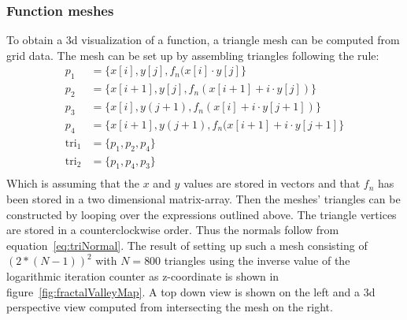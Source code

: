\subsubsection{Function meshes}
To obtain a 3d visualization of a function, a triangle mesh can be computed from grid data. The mesh can be set up by assembling triangles following the rule:
\begin{align}
p_1 &= \{x[i],y[j],f_n(x[i]\cdot y[j]\}			\\
p_2 &= \{x[i+1],y[j],f_n(x[i+1] + i\cdot y[j])\}		\\
p_3 &= \{x[i],y(j+1),f_n(x[i]+i\cdot y[j+1])\}		\\
p_4 &= \{x[i+1],y(j+1),f_n(x[i+1]+i\cdot y[j+1]\}	\\
\text{tri}_1 &= \{p_1,p_2,p_4\} \\
\text{tri}_2 &= \{p_1,p_4,p_3\} \\
\end{align}
Which is assuming that the $x$ and $y$ values are stored in vectors and that $f_n$ has been stored in a two dimensional matrix-array. Then the meshes' triangles
can be constructed by looping over the expressions outlined above. The triangle vertices are stored in a counterclockwise order. Thus the normals follow from equation~\ref{eq:triNormal}. The result of setting up such a mesh consisting of $(2*(N-1))^2$ with $N = 800$ triangles using the inverse value of the logarithmic iteration counter as z-coordinate is shown in figure~\ref{fig:fractalValleyMap}. A top down view is shown on the left and a 3d perspective view computed from intersecting the mesh on the right.

